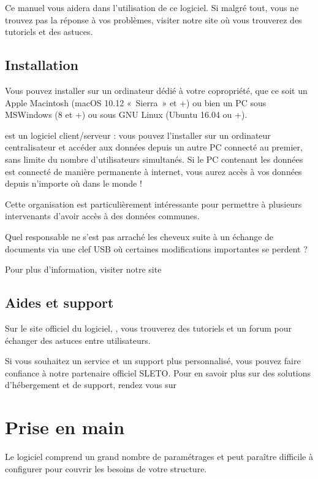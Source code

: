 \documentclass[a4paper,10pt,oneside,french]{sphinxmanual}
\begin{document}
\sphinxAtStartPar
Ce manuel vous aidera dans l’utilisation de ce logiciel.
Si malgré tout, vous ne trouvez pas la réponse à vos problèmes, visiter notre site  où vous trouverez des tutoriels et des astuces.


\subsection{Installation}
\label{\detokenize{syndic/presentation:installation}}
\sphinxAtStartPar
Vous pouvez installer  sur un ordinateur dédié à votre copropriété, que ce soit un Apple Macintosh (macOS 10.12 « Sierra » et +) ou bien un PC sous MS\sphinxhyphen{}Windows (8 et +) ou sous GNU Linux (Ubuntu 16.04 ou +).

\sphinxAtStartPar
{} est un logiciel client/serveur : vous pouvez l’installer sur un ordinateur centralisateur et accéder aux données depuis un autre PC connecté au premier, sans limite du nombre d’utilisateurs simultanés.
Si le PC contenant les données est connecté de manière permanente à internet, vous aurez accès à vos données depuis n’importe où dans le monde !

\sphinxAtStartPar
Cette organisation est particulièrement intéressante pour permettre à plusieurs intervenants d’avoir accès à des données communes.

\sphinxAtStartPar
Quel responsable ne s’est pas arraché les cheveux suite à un échange de documents via une clef USB où certaines modifications importantes se perdent ?

\sphinxAtStartPar
Pour plus d’information, visiter notre site 


\subsection{Aides et support}
\label{\detokenize{syndic/presentation:aides-et-support}}
\sphinxAtStartPar
Sur le site officiel du logiciel, , vous trouverez des tutoriels et un forum pour échanger des astuces entre utilisateurs.

\sphinxAtStartPar
Si vous souhaitez un service et un support plus personnalisé, vous pouvez faire confiance à notre partenaire officiel SLETO.
Pour en savoir plus sur des solutions d’hébergement et de support, rendez vous sur 


\section{Prise en main}
\label{\detokenize{syndic/first_step:prise-en-main}}\label{\detokenize{syndic/first_step::doc}}
\sphinxAtStartPar
Le logiciel  comprend un grand nombre de paramétrages et peut paraître difficile à configurer pour couvrir les besoins de votre structure.
\end{document}
